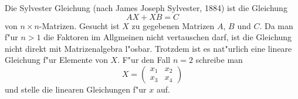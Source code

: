 Die Sylvester Gleichung (nach James Joseph Sylvester, 1884) ist die
Gleichung
\begin{equation}
AX+XB=C
\label{10000040:sylvester}
\end{equation}
von $n\times n$-Matrizen.
Gesucht ist $X$ zu gegebenen Matrizen $A$, $B$ und $C$.
Da man f"ur $n>1$ die Faktoren im Allgmeinen nicht vertauschen darf,
ist die Gleichung nicht direkt mit Matrizenalgebra l"osbar.
Trotzdem ist es nat"urlich eine lineare Gleichung f"ur Elemente von $X$.
F"ur den Fall $n=2$ schreibe man
\begin{equation}
X=\begin{pmatrix}
x_1&x_2\\
x_3&x_4
\end{pmatrix}
\label{10000040:sylvester2}
\end{equation}
und stelle die linearen Gleichungen f"ur $x$ auf.


